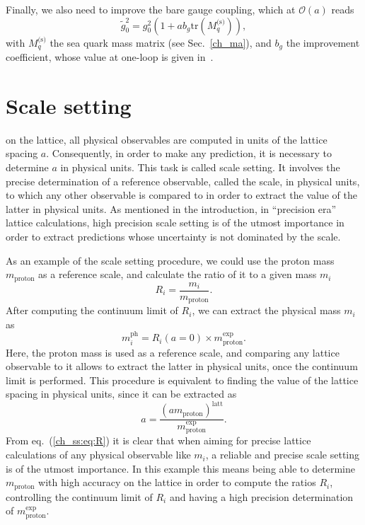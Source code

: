 Finally, we also need to improve the bare gauge coupling, which at $\mathcal{O}(a)$ reads
\begin{equation}
\tilde{g}_0^2=g_0^2\left(1+ab_g{\textrm{tr}}\left(M_q^{\textrm{(s)}}\right)\right),
\end{equation}
with $M_q^{\textrm{(s)}}$ the sea quark mass matrix (see Sec.~\ref{ch_ma}), and $b_g$ the improvement coefficient, whose value at one-loop is given in~\citep{Luscher:1996sc}.


\section{Scale setting}
\label{ch_foundation:sec:ss}

on the lattice, all physical observables are computed in units of the lattice spacing $a$. Consequently, in order to make any prediction, it is necessary to determine $a$ in physical units. This task is called scale setting. It involves the precise determination of a reference observable, called the scale, in physical units, to which any other observable is compared to in order to extract the value of the latter in physical units. As mentioned in the introduction, in ``precision era'' lattice calculations, high precision scale setting is of the utmost importance in order to extract predictions whose uncertainty is not dominated by the scale. 

As an example of the scale setting procedure, we could use the proton mass $m_{\textrm{proton}}$ as a reference scale, and calculate the ratio of it to a given mass $m_i$
\begin{equation}
R_i=\frac{m_i}{m_{\textrm{proton}}}.
\end{equation}
After computing the continuum limit of $R_i$, we can extract the physical mass $m_i$ as
\begin{equation}
\label{ch_ss:eq:R}
m_i^{\textrm{ph}}=R_i(a=0)\times m_{\textrm{proton}}^{\textrm{exp}}.
\end{equation}
Here, the proton mass is used as a reference scale, and comparing any lattice observable to it allows to extract the latter in physical units, once the continuum limit is performed. This procedure is equivalent to finding the value of the lattice spacing in physical units, since it can be extracted as 
\begin{equation}
a=\frac{(am_{\textrm{proton}})^{\textrm{latt}}}{m_{\textrm{proton}}^{\textrm{exp}}}.
\end{equation}
From eq.~(\ref{ch_ss:eq:R}) it is clear that when aiming for precise lattice calculations of any physical observable like $m_i$, a reliable and precise scale setting is of the utmost importance. In this example this means being able to determine $m_{\textrm{proton}}$ with high accuracy on the lattice in order to compute the ratios $R_i$, controlling the continuum limit of $R_i$ and having a high precision determination of $m_{\textrm{proton}}^{\textrm{exp}}$.

